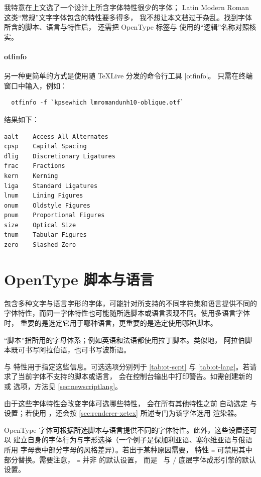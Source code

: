 \documentclass[a4paper]{l3doc}
\begin{document}
\noindent 我特意在上文选了一个设计上所含字体特性很少的字体；
Latin Modern Roman 这类“常规”文字字体包含的特性要多得多，
我不想让本文档过于杂乱。找到字体所含的脚本、语言与特性后，
还需把 OpenType 标签与  使用的“逻辑”名称对照核实。

\paragraph{otfinfo}
另一种更简单的方式是使用随 \TeX{}Live 分发的命令行工具 |otfinfo|。
只需在终端窗口中输入，例如：
\begin{Verbatim}
  otfinfo -f `kpsewhich lmromandunh10-oblique.otf`
\end{Verbatim}
结果如下：
\begin{Verbatim}[frame=single]
aalt	Access All Alternates
cpsp	Capital Spacing
dlig	Discretionary Ligatures
frac	Fractions
kern	Kerning
liga	Standard Ligatures
lnum	Lining Figures
onum	Oldstyle Figures
pnum	Proportional Figures
size	Optical Size
tnum	Tabular Figures
zero	Slashed Zero
\end{Verbatim}


\section{OpenType 脚本与语言}\label{sec:ot}

包含多种文字与语言字形的字体，可能针对所支持的不同字符集和语言提供不同的
字体特性，而同一字体特性也可能随所选脚本或语言表现不同。使用多语言字体时，
重要的是选定它用于哪种语言，更重要的是选定使用哪种脚本。

“脚本”指所用的字母体系；例如英语和法语都使用拉丁脚本。类似地，
阿拉伯脚本既可书写阿拉伯语，也可书写波斯语。

 与  特性用于指定这些信息。可选选项分别列于
\vref{tab:ot-scpt} 与 \vref{tab:ot-lang}。若请求了当前字体不支持的脚本或语言，
会在控制台输出中打印警告。如需创建新的  或 
选项，方法见 \vref{sec:newscriptlang}。

由于这些字体特性会改变字体可选哪些特性， 会在所有其他特性之前
自动选定  与  设置；若使用 \XeTeX，还会按
\vref{sec:renderer-xetex} 所述专门为该字体选用  渲染器。

OpenType 字体可根据所选脚本与语言提供不同的字体特性。此外，这些设置还可以
建立自身的字体行为与字形选择（一个例子是保加利亚语、塞尔维亚语与俄语所用
字母表中部分字母的风格差异）。若出于某种原因需要， 特性
 \texttt{=}  可禁用其中部分替换。需要注意，
 \texttt{=}  并非  的默认设置，
而是 \XeTeX\ 与 \LuaTeX/ 底层字体成形引擎的默认设置。
\end{document}
